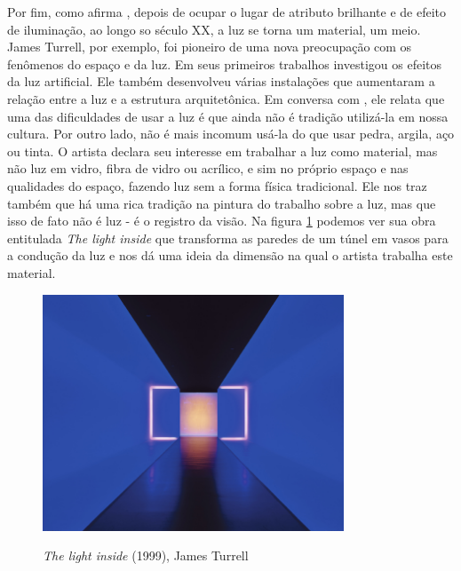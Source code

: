 Por fim, como afirma , depois de ocupar o lugar de atributo brilhante e de efeito de iluminação, ao longo so século XX, a luz se torna um material, um meio. James Turrell, por exemplo, foi pioneiro de uma nova preocupação com os fenômenos do espaço e da luz. Em seus primeiros trabalhos investigou os efeitos da luz artificial. Ele também desenvolveu várias instalações que aumentaram a relação entre a luz e a estrutura arquitetônica. Em conversa com , ele relata que uma das dificuldades de usar a luz é que ainda não é tradição utilizá-la em nossa cultura. Por outro lado, não é mais incomum usá-la do que usar pedra, argila, aço ou tinta. O artista declara seu interesse em trabalhar a luz como material, mas não luz em vidro, fibra de vidro ou acrílico, e sim no próprio espaço e nas qualidades do espaço, fazendo luz sem a forma física tradicional. Ele nos traz também que há uma rica tradição na pintura do trabalho sobre a luz, mas que isso de fato não é luz - é o registro da visão. Na figura \ref{fig:james_turrell} podemos ver sua obra entitulada \textit{The light inside} que transforma as paredes de um túnel em vasos para a condução da luz e nos dá uma ideia da dimensão na qual o artista trabalha este material. 

\begin{figure}[H]
    \centering
    \caption{\textit{The light inside} (1999), James Turrell}
	\vspace*{0,2cm}
    \includegraphics[width=0.8\textwidth]{./04-figuras/james_turrell}
    \label{fig:james_turrell}
\end{figure}
\vspace*{-0,9cm}
{\raggedright {}}\\






